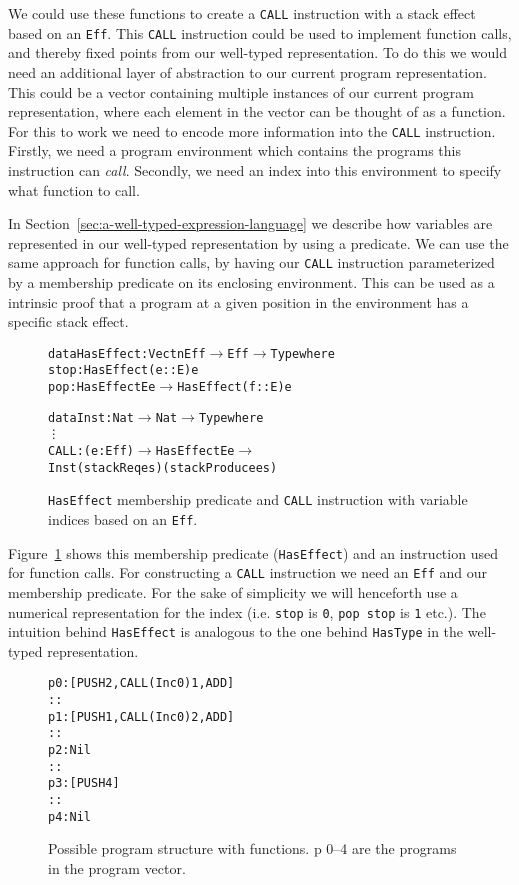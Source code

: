 We could use these functions to create a \texttt{CALL} instruction with a stack effect based on an \texttt{Eff}. This \texttt{CALL} instruction could be used to implement function calls, and thereby fixed points from our well-typed representation. To do this we would need an additional layer of abstraction to our current program representation. This could be a vector containing multiple instances of our current program representation, where each element in the vector can be thought of as a function. For this to work we need to encode more information into the \texttt{CALL} instruction. Firstly, we need a program environment which contains the programs this instruction can \emph{call}. Secondly, we need an index into this environment to specify what function to call.

In Section~\ref{sec:a-well-typed-expression-language} we describe how variables are represented in our well-typed representation by using a predicate. We can use the same approach for function calls, by having our \texttt{CALL} instruction parameterized by a membership predicate on its enclosing environment. This can be used as a intrinsic proof that a program at a given position in the environment has a specific stack effect. 

\begin{figure}
\begin{alltt}
data HasEffect : Vect n Eff \(\to\) Eff \(\to\) Type where
    stop : HasEffect (e :: E) e
    pop  : HasEffect E e \(\to\) HasEffect (f :: E) e

data Inst : Nat \(\to\) Nat \(\to\) Type where
    \vdots    
    CALL : (e : Eff) \(\to\) HasEffect E e \(\to\) 
           Inst (stackReq e s) (stackProduce e s)
\end{alltt}
\caption{\texttt{HasEffect} membership predicate and \texttt{CALL} instruction with variable indices based on an \texttt{Eff}.}
\label{fig:call}
\end{figure}

Figure~\ref{fig:call} shows this membership predicate (\texttt{HasEffect}) and an instruction used for function calls. For constructing a \texttt{CALL} instruction we need an \texttt{Eff} and our membership predicate. For the sake of simplicity we will henceforth use a numerical representation for the index (i.e. \texttt{stop} is \texttt{0}, \texttt{pop stop} is \texttt{1} etc.). The intuition behind \texttt{HasEffect} is analogous to the one behind \texttt{HasType} in the well-typed representation.

\begin{figure}
\begin{alltt}
p 0: [PUSH 2, CALL (Inc 0) 1, ADD]
     ::
p 1: [PUSH 1, CALL (Inc 0) 2, ADD]
     ::
p 2: Nil
     ::
p 3: [PUSH 4]
     ::
p 4: Nil
\end{alltt}
\caption{Possible program structure with functions. p 0--4 are the programs in the program vector.}
\label{fig:program_structure}
\end{figure}

